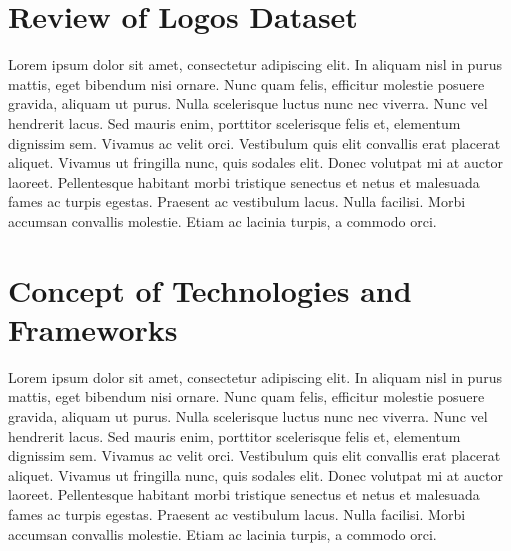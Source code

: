 \section{Review of Logos Dataset}\label{sec:4.3}
\vspace{-0.5cm}
\noindent Lorem ipsum dolor sit amet, consectetur adipiscing elit. In aliquam nisl in purus mattis, eget bibendum nisi ornare. Nunc quam felis, efficitur molestie posuere gravida, aliquam ut purus. Nulla scelerisque luctus nunc nec viverra. Nunc vel hendrerit lacus. Sed mauris enim, porttitor scelerisque felis et, elementum dignissim sem. Vivamus ac velit orci. Vestibulum quis elit convallis erat placerat aliquet. Vivamus ut fringilla nunc, quis sodales elit. Donec volutpat mi at auctor laoreet. Pellentesque habitant morbi tristique senectus et netus et malesuada fames ac turpis egestas. Praesent ac vestibulum lacus. Nulla facilisi. Morbi accumsan convallis molestie. Etiam ac lacinia turpis, a commodo orci.

\vspace{-0.3cm}


\section{Concept of Technologies and Frameworks}\label{sec:4.3}
\vspace{-0.5cm}
\noindent Lorem ipsum dolor sit amet, consectetur adipiscing elit. In aliquam nisl in purus mattis, eget bibendum nisi ornare. Nunc quam felis, efficitur molestie posuere gravida, aliquam ut purus. Nulla scelerisque luctus nunc nec viverra. Nunc vel hendrerit lacus. Sed mauris enim, porttitor scelerisque felis et, elementum dignissim sem. Vivamus ac velit orci. Vestibulum quis elit convallis erat placerat aliquet. Vivamus ut fringilla nunc, quis sodales elit. Donec volutpat mi at auctor laoreet. Pellentesque habitant morbi tristique senectus et netus et malesuada fames ac turpis egestas. Praesent ac vestibulum lacus. Nulla facilisi. Morbi accumsan convallis molestie. Etiam ac lacinia turpis, a commodo orci.

\vspace{-0.3cm}


